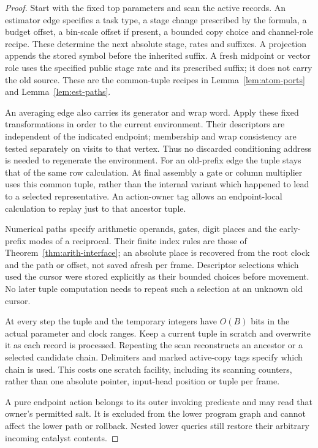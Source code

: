 \begin{proof}
Start with the fixed top parameters and scan the active records.  An
estimator edge specifies a task type, a stage change prescribed by the
formula, a budget offset, a bin-scale offset if present, a bounded copy
choice and channel-role recipe.  These determine the next absolute
stage, rates and suffixes.  A projection appends the stored symbol
before the inherited suffix.  A fresh midpoint or vector role uses the
specified public stage rate and its prescribed suffix; it does not
carry the old source.  These are the common-tuple recipes in
Lemma~\ref{lem:atom-ports} and Lemma~\ref{lem:est-paths}.

An averaging edge also carries its generator and wrap word.  Apply
these fixed transformations in order to the current environment.  Their
descriptors are independent of the indicated endpoint; membership and
wrap consistency are tested separately on visits to that vertex.
Thus no discarded conditioning address is needed to regenerate the
environment.  For an old-prefix edge the tuple stays that of the same
row calculation.  At final assembly a gate or column multiplier uses
this common tuple, rather than the internal variant which happened to
lead to a selected representative.  An action-owner tag allows an
endpoint-local calculation to replay just to that ancestor tuple.

Numerical paths specify arithmetic operands, gates, digit places and
the early-prefix modes of a reciprocal.  Their finite index rules are
those of Theorem~\ref{thm:arith-interface}; an absolute place is recovered
from the root clock and the path or offset, not saved afresh per frame.
Descriptor selections which used the cursor were stored explicitly as
their bounded choices before movement.  No later tuple computation
needs to repeat such a selection at an unknown old cursor.

At every step the tuple and the temporary integers have $O(B)$ bits in
the actual parameter and clock ranges.  Keep a current tuple in scratch
and overwrite it as each record is processed.  Repeating the scan
reconstructs an ancestor or a selected candidate chain.  Delimiters and
marked active-copy tags specify which chain is used.  This costs one
scratch facility, including its scanning counters, rather than one
absolute pointer, input-head position or tuple per frame.

A pure endpoint action belongs to its outer invoking predicate and may
read that owner's permitted salt.  It is excluded from the lower program
graph and cannot affect the lower path or rollback.  Nested lower queries
still restore their arbitrary incoming catalyst contents.


\end{proof}
